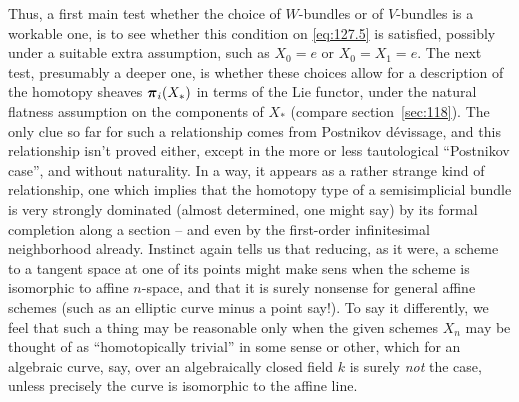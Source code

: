 Thus, a first main test whether the choice of $W$-bundles or of
$V$-bundles is a workable one, is to see whether this condition on
\eqref{eq:127.5} is satisfied, possibly under a suitable extra
assumption, such as $X_0=e$ or $X_0=X_1=e$. The next test, presumably
a deeper one, is whether these choices allow for a description of the
homotopy sheaves ${\boldsymbol\pi}_i(X_*)$ in terms of the Lie functor, under the
natural flatness assumption on the components of $X_*$ (compare
section~\ref{sec:118}). The only clue so far for such a relationship
comes from Postnikov dévissage, and this relationship isn't proved
either, except in the more or less tautological ``Postnikov case'',
and without naturality. In a way, it appears as a rather strange kind
of relationship, one which implies that the homotopy type of a
semisimplicial bundle is very strongly dominated (almost determined,
one might say) by its formal completion along a section -- and even by
the first-order infinitesimal neighborhood already. Instinct again
tells us that reducing, as it were, a scheme to a tangent space at one
of its points might make sens when the scheme is isomorphic to affine
$n$-space, and that it is surely nonsense for general affine schemes
(such as an elliptic curve minus a point say!). To say it differently,
we feel that such a thing may be reasonable only when the given
schemes $X_n$ may be thought of as ``homotopically trivial'' in some
sense or other, which for an algebraic curve, say, over an
algebraically closed field $k$ is surely \emph{not} the case, unless
precisely the curve is isomorphic to the affine line.

\bigbreak

\noindent\hfill{}\par

